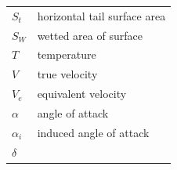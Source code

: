 \documentclass[
]{book}
\begin{document}
\begin{longtable}[]{@{}ll@{}}
\begin{minipage}[t]{0.22\columnwidth}\raggedright
\(S_t\)\strut
\end{minipage} & \begin{minipage}[t]{0.72\columnwidth}\raggedright
horizontal tail surface area\strut
\end{minipage}\tabularnewline
\begin{minipage}[t]{0.22\columnwidth}\raggedright
\(S_W\)\strut
\end{minipage} & \begin{minipage}[t]{0.72\columnwidth}\raggedright
wetted area of surface\strut
\end{minipage}\tabularnewline
\begin{minipage}[t]{0.22\columnwidth}\raggedright
\(T\)\strut
\end{minipage} & \begin{minipage}[t]{0.72\columnwidth}\raggedright
temperature\strut
\end{minipage}\tabularnewline
\begin{minipage}[t]{0.22\columnwidth}\raggedright
\(V\)\strut
\end{minipage} & \begin{minipage}[t]{0.72\columnwidth}\raggedright
true velocity\strut
\end{minipage}\tabularnewline
\begin{minipage}[t]{0.22\columnwidth}\raggedright
\(V_e\)\strut
\end{minipage} & \begin{minipage}[t]{0.72\columnwidth}\raggedright
equivalent velocity\strut
\end{minipage}\tabularnewline
\begin{minipage}[t]{0.22\columnwidth}\raggedright
\(\alpha\)\strut
\end{minipage} & \begin{minipage}[t]{0.72\columnwidth}\raggedright
angle of attack\strut
\end{minipage}\tabularnewline
\begin{minipage}[t]{0.22\columnwidth}\raggedright
\(\alpha_i\)\strut
\end{minipage} & \begin{minipage}[t]{0.72\columnwidth}\raggedright
induced angle of attack\strut
\end{minipage}\tabularnewline
\begin{minipage}[t]{0.22\columnwidth}\raggedright
\(\delta\)\strut
\end{minipage} & \begin{minipage}[t]{0.72\columnwidth}\raggedright

\end{minipage}
\end{longtable}
\end{document}
